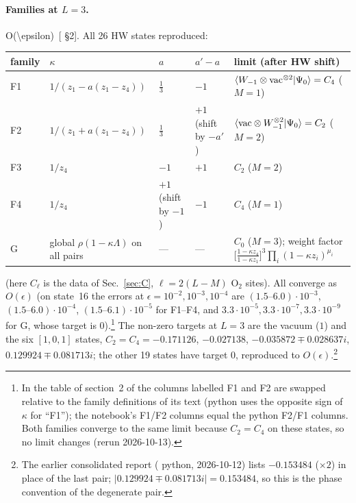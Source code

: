 \paragraph{Families at $L=3$.} \num{O(\epsilon)}\ [ \S2]. All 26 HW states reproduced:
\begin{center}\small
\begin{tabular}{@{}l>{\raggedright\arraybackslash}p{3.4cm}>{\raggedright\arraybackslash}p{2.4cm}>{\raggedright\arraybackslash}p{1.9cm}>{\raggedright\arraybackslash}p{5.2cm}@{}}
\toprule
family & $\kappa$ & $a$ & $a'-a$ & limit (after HW shift)\\
\midrule
F1 & $1/(z_1-a(z_1-z_4))$ & $\tfrac13$ & $-1$ & $\langle W_{-1}\otimes\mathrm{vac}^{\otimes2}|\Psi_0\rangle=C_4$ ($M=1$)\\
F2 & $1/(z_1+a(z_1-z_4))$ & $\tfrac13$ & $+1$ (shift by $-a'$) & $\langle\mathrm{vac}\otimes W_{-1}^{\otimes2}|\Psi_0\rangle=C_2$ ($M=2$)\\
F3 & $1/z_4$ & $-1$ & $+1$ & $C_2$ ($M=2$)\\
F4 & $1/z_4$ & $+1$ (shift by $-1$) & $-1$ & $C_4$ ($M=1$)\\
G & global $\rho(1-\kappa\Lambda)$ on all pairs & --- & --- & $C_0$ ($M=3$); weight factor $\big[\tfrac{1-\kappa z_4}{1-\kappa z_1}\big]^3\prod_i(1-\kappa z_i)^{\mu_i}$\\
\bottomrule
\end{tabular}
\end{center}
(here $C_\ell$ is the data of Sec.~\ref{sec:C}, $\ell=2(L-M)$ O$_2$ sites). All converge as $O(\epsilon)$ (on state~16 the errors at $\epsilon=10^{-2},10^{-3},10^{-4}$ are $(1.5\text{--}6.0)\cdot10^{-3}$, $(1.5\text{--}6.0)\cdot10^{-4}$, $(1.5\text{--}6.1)\cdot10^{-5}$ for F1--F4, and $3.3\cdot10^{-5},3.3\cdot10^{-7},3.3\cdot10^{-9}$ for G, whose target is $0$).\footnote{In the table of section~2 of
 the columns labelled F1 and F2 are swapped relative to the family definitions of its text (python  uses the opposite sign of $\kappa$ for ``F1''); the notebook's F1/F2 columns equal the python F2/F1 columns. Both families converge to the same limit because $C_2=C_4$ on these states, so no
limit changes (rerun 2026-10-13).} The non-zero targets at $L=3$ are the vacuum ($1$) and the six $[1,0,1]$ states, $C_2=C_4=-0.171126$, $-0.027138$, $-0.035872\mp0.028637i$, $0.129924\mp0.081713i$; the other 19 states have target $0$, reproduced to $O(\epsilon)$.\footnote{The earlier
consolidated report ( python, 2026-10-12) lists $-0.153484$ ($\times2$) in place of the last pair; $|0.129924\mp0.081713i|=0.153484$, so this is the phase convention of the degenerate pair.}

